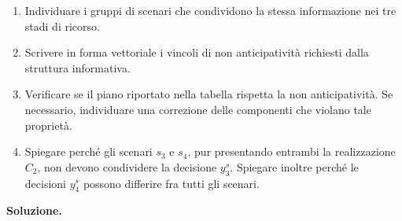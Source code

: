 \begin{exercise}
\begin{enumerate}

\item Individuare i gruppi di scenari
che condividono la stessa informazione
nei tre stadi di ricorso.

\item Scrivere in forma vettoriale
i vincoli di non anticipativit\`a
richiesti dalla struttura informativa.

\item Verificare se il piano riportato
nella tabella rispetta la non anticipativit\`a.
Se necessario, individuare una correzione
delle componenti che violano tale propriet\`a.

\item Spiegare perch\'{e} gli scenari
$s_3$ e $s_4$, pur presentando entrambi
la realizzazione $C_2$, non devono
condividere la decisione $y_3^s$.
Spiegare inoltre perch\'{e} le decisioni
$y_4^s$ possono differire fra tutti
gli scenari.

\end{enumerate}

\end{exercise}

\noindent
\textbf{Soluzione.}


